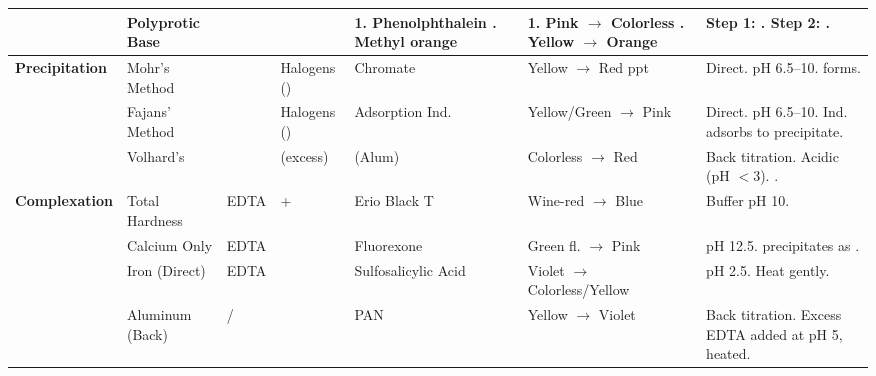 \begin{table}[htbp]
\begin{tabularx}{\textwidth}{@{} L{1.7cm} L{2.2cm} L{1.4cm} L{1.8cm} L{2.4cm} L{2.8cm} Y @{}}
        & Polyprotic Base &  &  
        & 1. Phenolphthalein . Methyl orange & 1. Pink $\to$ Colorless . Yellow $\to$ Orange & Step 1: . \newline Step 2: . \\ 
        \midrule
        
        \textbf{Precipitation} 
        & Mohr's Method &  & Halogens () 
        & Chromate & Yellow $\to$ Red ppt & Direct. pH 6.5--10.  forms. \\ 
        
        & Fajans' Method &  & Halogens () 
        & Adsorption Ind. & Yellow/Green $\to$ Pink & Direct. pH 6.5--10. Ind. adsorbs to precipitate. \\ 
        
        & Volhard's &  &  (excess) 
        &  (Alum) & Colorless $\to$ Red & Back titration. Acidic (pH $<3$). . \\ 
        \midrule
        
        \textbf{Complexation} 
        & Total Hardness & EDTA &  +  
        & Erio Black T & Wine-red $\to$ Blue & Buffer pH 10. \\ 
        
        & Calcium Only & EDTA &  
        & Fluorexone & Green fl. $\to$ Pink & pH 12.5.  precipitates as . \\ 
        
        & Iron (Direct) & EDTA &  
        & Sulfosalicylic Acid & Violet $\to$ Colorless/Yellow & pH 2.5. Heat gently. \\ 
        
        & Aluminum (Back) & / &  
        & PAN & Yellow $\to$ Violet & Back titration. Excess EDTA added at pH 5, heated. \\ 
        
        \bottomrule
    \end{tabularx}
\end{table}

